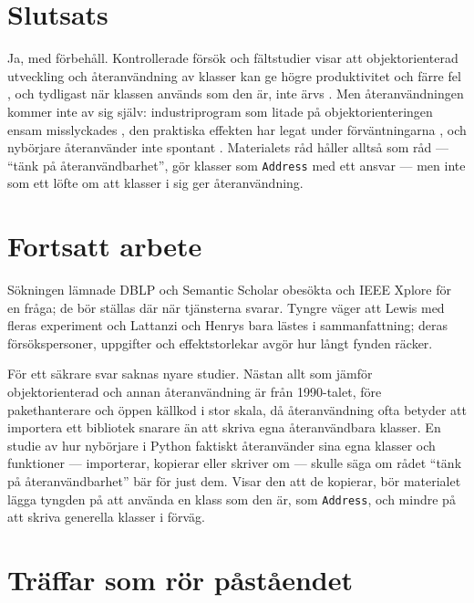 \section{Slutsats}
\label{sec:ater-slutsats}

Ja, med förbehåll.  Kontrollerade försök och fältstudier visar att
objektorienterad utveckling och återanvändning av klasser kan ge högre
produktivitet och färre fel
\autocite{Lewis1991Reuse,Basili1996Reuse,LowHuan1999}, och tydligast när
klassen används som den är, inte ärvs \autocite{LattanziHenry1998}.
Men återanvändningen kommer inte av sig själv: industriprogram som
litade på objektorienteringen ensam misslyckades \autocite{Morisio2002Reuse},
den praktiska effekten har legat under förväntningarna
\autocite{BiddleTempero1998}, och nybörjare återanvänder inte spontant
\autocite{Detienne1997}.  Materialets råd håller alltså som råd ---
\enquote{tänk på återanvändbarhet}, gör klasser som
\texttt{Address} med ett ansvar --- men inte som ett löfte om
att klasser i sig ger återanvändning.

\section{Fortsatt arbete}
\label{sec:ater-fortsatt}

Sökningen lämnade DBLP och Semantic Scholar obesökta och IEEE Xplore för
en fråga; de bör ställas där när tjänsterna svarar.  Tyngre väger att
Lewis med fleras experiment\autocite{Lewis1991Reuse} och Lattanzi och
Henrys\autocite{LattanziHenry1998} bara lästes i sammanfattning; deras
försökspersoner, uppgifter och effektstorlekar avgör hur långt fynden
räcker.

För ett säkrare svar saknas nyare studier.  Nästan allt som jämför
objektorienterad och annan återanvändning är från 1990-talet, före
pakethanterare och öppen källkod i stor skala, då återanvändning ofta
betyder att importera ett bibliotek snarare än att skriva egna
återanvändbara klasser.  En studie av hur nybörjare i Python faktiskt
återanvänder sina egna klasser och funktioner --- importerar, kopierar
eller skriver om --- skulle säga om rådet \enquote{tänk på
återanvändbarhet} bär för just dem.  Visar den att de kopierar, bör
materialet lägga tyngden på att använda en klass som den är, som
\texttt{Address}, och mindre på att skriva generella
klasser i förväg.

\section{Träffar som rör påståendet}
\label{sec:ater-traffar}

